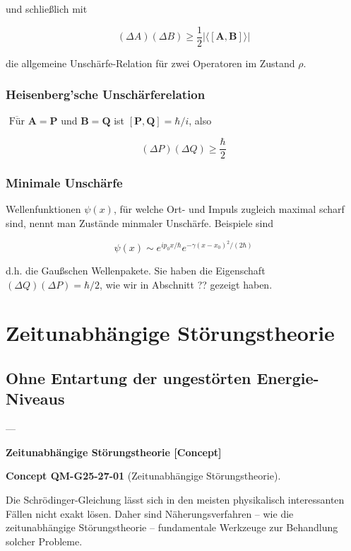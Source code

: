 \documentclass[10pt, letterpaper]{article}
\newcommand{\CustomHeading}[3]{%
  \par\medskip\noindent%
  \textbf{#1 #2} \textnormal{(#3)}.\enskip%
}
\newenvironment{CONC}[2]{\begin{unitbox}\CustomHeading{Concept}{#1}{#2}}{\end{unitbox}}
\begin{document}
und schließlich mit

$$
(\Delta A)(\Delta B) \geq \frac{1}{2}|\langle[\mathbf{A}, \mathbf{B}]\rangle|
$$

die allgemeine Unschärfe-Relation für zwei Operatoren im Zustand $\rho$.

\subsubsection*{Heisenberg'sche Unschärferelation}
$\overline{\text { Für }} \mathbf{A}=\mathbf{P}$ und $\mathbf{B}=\mathbf{Q}$ ist $[\mathbf{P}, \mathbf{Q}]=\hbar / i$, also

$$
(\Delta P)(\Delta Q) \geq \frac{\hbar}{2}
$$

\subsubsection*{Minimale Unschärfe}
Wellenfunktionen $\psi(x)$, für welche Ort- und Impuls zugleich maximal scharf sind, nennt man Zustände minmaler Unschärfe. Beispiele sind

$$
\psi(x) \sim e^{i p_{0} x / \hbar} e^{-\gamma\left(x-x_{0}\right)^{2} /(2 \hbar)}
$$

d.h. die Gaußschen Wellenpakete. Sie haben die Eigenschaft $(\Delta Q)(\Delta P)=\hbar / 2$, wie wir in Abschnitt ?? gezeigt haben.












\pagebreak


\section{Zeitunabhängige Störungstheorie}


\subsection{Ohne Entartung der ungestörten Energie-Niveaus}

---

\textbf{Zeitunabhängige Störungstheorie [Concept]}

\begin{CONC}{QM-G25-27-01}{Zeitunabhängige Störungstheorie}
Die Schrödinger-Gleichung lässt sich in den meisten physikalisch interessanten Fällen nicht exakt lösen. Daher sind Näherungsverfahren – wie die zeitunabhängige Störungstheorie – fundamentale Werkzeuge zur Behandlung solcher Probleme.
\end{CONC}
\end{document}
